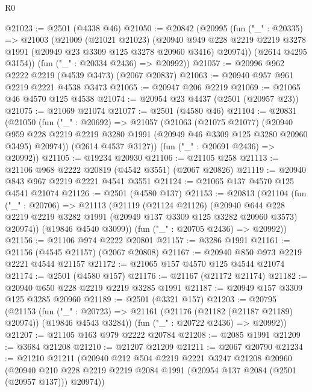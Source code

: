 \begin{lexlean}{R0}
\begin{coremodule}
@21023 := @2501 (@4338 @46)
@21050 := @20842
    (@20995
      (fun ("_" : @20335) =>
      @21003
        (@21009
          (@21021 @21023)
          (@20940
            @949
            @228
            @2219
            @2219
            @3278
            @1991
            (@20949 @23 @3309 @125 @3278 @20960 @3416)
            @20974))
        (@2614 @4295 @3154))
      (fun ("_" : @20334 @2436) => @20992))
@21057 := @20996 @962 @2222 @2219 (@4539 @3473) (@2067 @20837)
@21063 := @20940 @957 @961 @2219 @2221 @4538 @3473
@21065 := @20947 @206 @2219
@21069 := @21065 @46 @4570 @125 @4538
@21074 := @20954 @23 @4437 (@2501 (@20957 @23))
@21075 := @21069 @21074
@21077 := @2501 (@4580 @46)
@21104 := @20831
    (@21050
      (fun ("_" : @20692) =>
      @21057
        (@21063
          (@21075 @21077)
          (@20940
            @959
            @228
            @2219
            @2219
            @3280
            @1991
            (@20949 @46 @3309 @125 @3280 @20960 @3495)
            @20974))
        (@2614 @4537 @3127))
      (fun ("_" : @20691 @2436) => @20992))
@21105 := @19234 @20930
@21106 := @21105 @258
@21113 := @21106 @968 @2222 @20819 (@4542 @3551) (@2067 @20826)
@21119 := @20940 @843 @967 @2219 @2221 @4541 @3551
@21124 := @21065 @137 @4570 @125 @4541 @21074
@21126 := @2501 (@4580 @137)
@21153 := @20813
    (@21104
      (fun ("_" : @20706) =>
      @21113
        (@21119
          (@21124 @21126)
          (@20940
            @644
            @228
            @2219
            @2219
            @3282
            @1991
            (@20949 @137 @3309 @125 @3282 @20960 @3573)
            @20974))
        (@19846 @4540 @3099))
      (fun ("_" : @20705 @2436) => @20992))
@21156 := @21106 @974 @2222 @20801
@21157 := @3286 @1991
@21161 := @21156 (@4545 @21157) (@2067 @20808)
@21167 := @20940 @850 @973 @2219 @2221 @4544 @21157
@21172 := @21065 @157 @4570 @125 @4544 @21074
@21174 := @2501 (@4580 @157)
@21176 := @21167 (@21172 @21174)
@21182 := @20940 @650 @228 @2219 @2219 @3285 @1991
@21187 := @20949 @157 @3309 @125 @3285 @20960
@21189 := @2501 (@3321 @157)
@21203 := @20795
    (@21153
      (fun ("_" : @20723) => @21161 (@21176 (@21182 (@21187 @21189) @20974)) (@19846 @4543 @3284))
      (fun ("_" : @20722 @2436) => @20992))
@21207 := @21105 @163 @979 @2222 @20784
@21208 := @2085 @1991
@21209 := @3684 @21208
@21210 := @21207 @21209
@21211 := @2067 @20790
@21234 := @21210
    @21211
    (@20940
      @212
      @504
      @2219
      @2221
      @3247
      @21208
      @20960
      (@20940 @210 @228 @2219 @2219 @2084 @1991 (@20954 @137 @2084 (@2501 (@20957 @137))) @20974))

\end{coremodule}
\end{lexlean}
